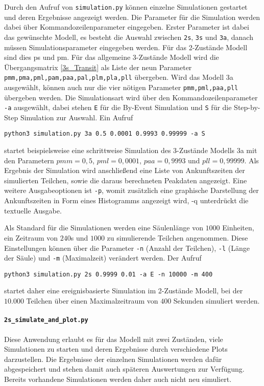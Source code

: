 Durch den Aufruf von \texttt{simulation.py} können einzelne Simulationen gestartet und deren Ergebnisse angezeigt werden.
Die Parameter für die Simulation werden dabei über Kommandozeilenparameter eingegeben. Erster Parameter ist dabei das gewünschte Modell, es besteht die Auswahl zwischen \texttt{2s}, \texttt{3s} und \texttt{3a}, danach müssen Simulationsparameter eingegeben werden. Für das 2-Zustände Modell sind dies ps und pm. Für das allgemeine 3-Zustände Modell wird die Übergangsmatrix \ref{3s_Transit} als Liste der neun Parameter \verb!pmm,pma,pml,pam,paa,pal,plm,pla,pll! übergeben. Wird das Modell 3a ausgewählt, können auch nur die vier nötigen Parameter \verb!pmm,pml,paa,pll! übergeben werden.
Die Simulationsart wird über den Kommandozeilenparameter \texttt{-a} ausgewählt, dabei stehen \texttt{E} für die By-Event Simulation und \texttt{S} für die Step-by-Step Simulation zur Auswahl.
Ein Aufruf
\begin{verbatim}
python3 simulation.py 3a 0.5 0.0001 0.9993 0.99999 -a S
\end{verbatim}
startet beispielsweise eine schrittweise Simulation des 3-Zustände Modells 3a mit den Parametern $pmm = 0,5$, $pml = 0,0001$, $paa = 0,9993$ und $pll = 0,99999$. Als Ergebnis der Simulation wird anschließend eine Liste von Ankunftszeiten der simulierten Teilchen, sowie die daraus berechneten Peakdaten angezeigt. Eine weitere Ausgabeoptionen ist \texttt{-p}, womit zusätzlich eine graphische Darstellung der Ankunftszeiten in Form eines Histogramms angezeigt wird, -q unterdrückt die textuelle Ausgabe.

Als Standard für die Simulationen werden eine Säulenlänge von $1000$ Einheiten, ein Zeitraum von $240$s und $1000$ zu simulierende Teilchen angenommen. Diese Einstellungen können über die Parameter \texttt{-n} (Anzahl der Teilchen), \texttt{-l} (Länge der Säule) und \verb!-m! (Maximalzeit) verändert werden.
Der Aufruf
\begin{verbatim}
python3 simulation.py 2s 0.9999 0.01 -a E -n 10000 -m 400
\end{verbatim}
startet daher eine ereignisbasierte Simulation im 2-Zustände Modell, bei der $10.000$ Teilchen über einen Maximalzeitraum von $400$ Sekunden simuliert werden.


\paragraph{\texttt{2s\_simulate\_and\_plot.py}}
Diese Anwendung erlaubt es für das Modell mit zwei Zuständen, viele Simulationen zu starten und deren Ergebnisse durch verschiedene Plots darzustellen. Die Ergebnisse der einzelnen Simulationen werden dafür abgespeichert und stehen damit auch späteren Auswertungen zur Verfügung. Bereits vorhandene Simulationen werden daher auch nicht neu simuliert.


